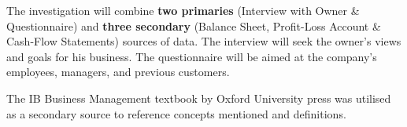 {The investigation will combine \textbf{two primaries} (Interview with Owner \& Questionnaire) and \textbf{three secondary} (Balance Sheet, Profit-Loss Account \& Cash-Flow Statements) sources of data. The interview will seek the owner's views and goals for his business. The questionnaire will be aimed at the company's employees, managers, and previous customers.}

{The IB Business Management textbook by Oxford University press was utilised as a secondary source to reference concepts mentioned and definitions.}

